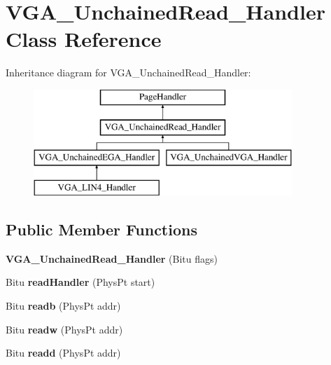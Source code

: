 \hypertarget{classVGA__UnchainedRead__Handler}{\section{V\-G\-A\-\_\-\-Unchained\-Read\-\_\-\-Handler Class Reference}
\label{classVGA__UnchainedRead__Handler}
}
Inheritance diagram for V\-G\-A\-\_\-\-Unchained\-Read\-\_\-\-Handler\-:\begin{figure}[H]
\begin{center}
\leavevmode
\includegraphics[height=4.000000cm]{classVGA__UnchainedRead__Handler}
\end{center}
\end{figure}
\subsection*{Public Member Functions}
\begin{DoxyCompactItemize}
\item 
\hypertarget{classVGA__UnchainedRead__Handler_a8de3a771f817ff97e426d47632d9c689}{{\bfseries V\-G\-A\-\_\-\-Unchained\-Read\-\_\-\-Handler} (Bitu flags)}\label{classVGA__UnchainedRead__Handler_a8de3a771f817ff97e426d47632d9c689}

\item 
\hypertarget{classVGA__UnchainedRead__Handler_a9df87c06e7a2192bde35009fc01893db}{Bitu {\bfseries read\-Handler} (Phys\-Pt start)}\label{classVGA__UnchainedRead__Handler_a9df87c06e7a2192bde35009fc01893db}

\item 
\hypertarget{classVGA__UnchainedRead__Handler_aff6363745132237900784bd354f72388}{Bitu {\bfseries readb} (Phys\-Pt addr)}\label{classVGA__UnchainedRead__Handler_aff6363745132237900784bd354f72388}

\item 
\hypertarget{classVGA__UnchainedRead__Handler_aeb5198fb3bfed415d119ea8ddd35d418}{Bitu {\bfseries readw} (Phys\-Pt addr)}\label{classVGA__UnchainedRead__Handler_aeb5198fb3bfed415d119ea8ddd35d418}

\item 
\hypertarget{classVGA__UnchainedRead__Handler_ada6914b00dc021441bbb62ff54b25565}{Bitu {\bfseries readd} (Phys\-Pt addr)}\label{classVGA__UnchainedRead__Handler_ada6914b00dc021441bbb62ff54b25565}

\end{DoxyCompactItemize}


